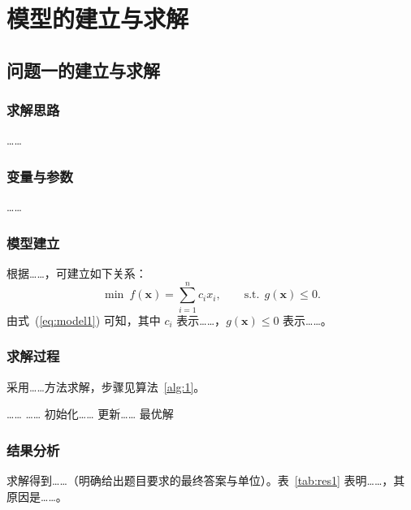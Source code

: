 \documentclass[12pt, a4paper]{ctexart}
\begin{document}
\section{模型的建立与求解}

\subsection{问题一的建立与求解}

\subsubsection{求解思路}
……

\subsubsection{变量与参数}
……

\subsubsection{模型建立}
根据……，可建立如下关系：
\begin{equation}
  \min\ f(\bm{x}) = \sum_{i=1}^{n} c_i x_i , \qquad \text{s.t.}\ \ g(\bm{x}) \le 0 .
  \label{eq:model1}
\end{equation}
由式~(\ref{eq:model1}) 可知，其中 $c_i$ 表示……，$g(\bm{x})\le 0$ 表示……。

\subsubsection{求解过程}
采用……方法求解，步骤见算法~\ref{alg:1}。

\begin{algorithm}[htbp]
  \caption{……求解算法}
  \label{alg:1}
  \begin{algorithmic}[1]
    \Require ……
    \Ensure ……
    \State 初始化……
      \State 更新……
    \EndWhile
    \State \Return 最优解
  \end{algorithmic}
\end{algorithm}

\subsubsection{结果分析}
求解得到……（明确给出题目要求的最终答案与单位）。表~\ref{tab:res1} 表明……，其原因是……。
\end{document}
